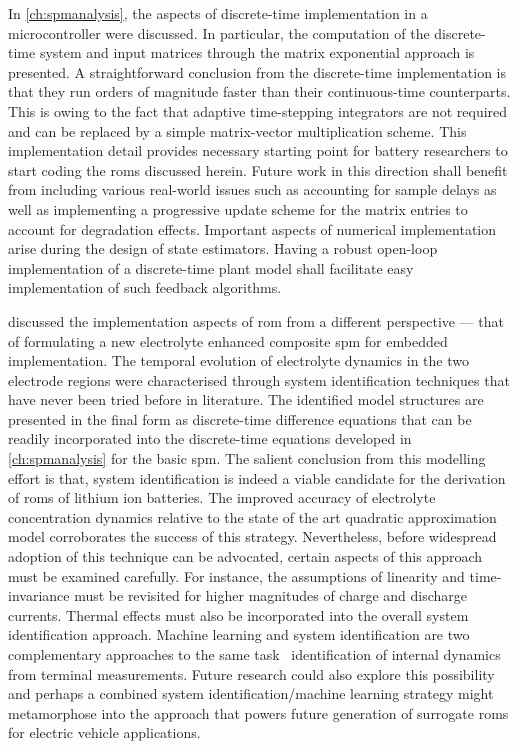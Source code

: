 In \cref{ch:spmanalysis}, the aspects of discrete-time implementation in a
microcontroller were discussed. In particular, the computation of the
discrete-time system and input matrices through  the  matrix exponential
approach is presented. A straightforward conclusion from the discrete-time
implementation is that they run orders of magnitude faster than their
continuous-time counterparts. This is owing to the fact that adaptive
time-stepping integrators are not required and can be replaced by a simple
matrix-vector multiplication scheme. This implementation detail provides
necessary starting point for battery researchers to start coding the \glspl{rom}
discussed herein. Future work in this direction shall benefit from including
various real-world issues such as accounting for sample delays as well as
implementing a progressive update scheme for the matrix entries to account for
degradation effects. Important aspects of numerical implementation arise during
the design of state estimators. Having a robust open-loop implementation of a
discrete-time plant model shall facilitate easy implementation of such feedback
algorithms.

 discussed the implementation aspects of \gls{rom}
from a different perspective --- that of formulating a new electrolyte enhanced
composite \gls{spm} for embedded implementation. The temporal evolution of
electrolyte dynamics in the two electrode regions were characterised through
system identification techniques that have never been tried before in
literature. The identified model structures are presented in the final form as
discrete-time difference equations that can be readily incorporated into the
discrete-time equations developed in \cref{ch:spmanalysis} for the basic
\gls{spm}. The salient conclusion from this modelling effort is that, system
identification is indeed a viable candidate for the derivation of \glspl{rom} of
lithium ion batteries. The improved accuracy of electrolyte concentration
dynamics relative to the state of the art quadratic approximation model
corroborates the success of this strategy. Nevertheless, before widespread
adoption of this technique can be advocated, certain aspects of this approach
must be examined carefully. For instance, the assumptions of linearity and
time-invariance must be revisited for higher magnitudes of charge and discharge
currents. Thermal effects must also be incorporated into the overall system
identification approach. Machine learning and system identification are two
complementary approaches to the same task \ie~identification of internal
dynamics from terminal measurements. Future research could also explore this
possibility and perhaps a combined system identification/machine learning
strategy might metamorphose into the approach that powers future generation of
surrogate \glspl{rom} for electric vehicle applications.

